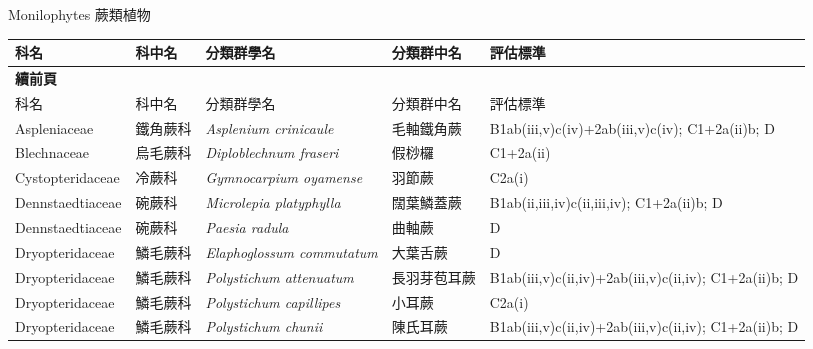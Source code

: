 \noindent\normalfont\selectfont Monilophytes 蕨類植物
\footnotesize\selectfont
        {\def\arraystretch{1.5}\tabcolsep=2pt
        \begin{longtable}{p{2.5cm}p{2.5cm}p{4.5cm}p{2.5cm}p{3cm}}
        \toprule
          科名 & 科中名 & 分類群學名 & 分類群中名 & 評估標準 \\
        \midrule 
        \endfirsthead

        {{\bfseries 續前頁 }} \\
        科名 & 科中名 & 分類群學名 & 分類群中名 & 評估標準 \\
        \midrule
        \endhead
                Aspleniaceae & 鐵角蕨科 & \textit{Asplenium crinicaule}  & 毛軸鐵角蕨 & B1ab(iii,v)c(iv)+2ab(iii,v)c(iv); C1+2a(ii)b; D \index{Asplenium@\textit{Asplenium}!crinicaule@\textit{crinicaule}}  \index{毛軸鐵角蕨} \\
    Blechnaceae & 烏毛蕨科 & \textit{Diploblechnum fraseri}  & 假桫欏 & C1+2a(ii) \index{Diploblechnum@\textit{Diploblechnum}!fraseri@\textit{fraseri}}  \index{假桫欏} \\
    Cystopteridaceae & 冷蕨科 & \textit{Gymnocarpium oyamense}  & 羽節蕨 & C2a(i) \index{Gymnocarpium@\textit{Gymnocarpium}!oyamense@\textit{oyamense}}  \index{羽節蕨} \\
    Dennstaedtiaceae & 碗蕨科 & \textit{Microlepia platyphylla}  & 闊葉鱗蓋蕨 & B1ab(ii,iii,iv)c(ii,iii,iv); C1+2a(ii)b; D \index{Microlepia@\textit{Microlepia}!platyphylla@\textit{platyphylla}}  \index{闊葉鱗蓋蕨} \\
    Dennstaedtiaceae & 碗蕨科 & \textit{Paesia radula}  & 曲軸蕨 & D \index{Paesia@\textit{Paesia}!radula@\textit{radula}}  \index{曲軸蕨} \\
    Dryopteridaceae & 鱗毛蕨科 & \textit{Elaphoglossum commutatum}  & 大葉舌蕨 & D \index{Elaphoglossum@\textit{Elaphoglossum}!commutatum@\textit{commutatum}}  \index{大葉舌蕨} \\
    Dryopteridaceae & 鱗毛蕨科 & \textit{Polystichum attenuatum}  & 長羽芽苞耳蕨 & B1ab(iii,v)c(ii,iv)+2ab(iii,v)c(ii,iv); C1+2a(ii)b; D \index{Polystichum@\textit{Polystichum}!attenuatum@\textit{attenuatum}}  \index{長羽芽苞耳蕨} \\
    Dryopteridaceae & 鱗毛蕨科 & \textit{Polystichum capillipes}  & 小耳蕨 & C2a(i) \index{Polystichum@\textit{Polystichum}!capillipes@\textit{capillipes}}  \index{小耳蕨} \\
    Dryopteridaceae & 鱗毛蕨科 & \textit{Polystichum chunii}  & 陳氏耳蕨 & B1ab(iii,v)c(ii,iv)+2ab(iii,v)c(ii,iv); C1+2a(ii)b; D \index{Polystichum@\textit{Polystichum}!chunii@\textit{chunii}}  \index{陳氏耳蕨} \\

\end{longtable}}
